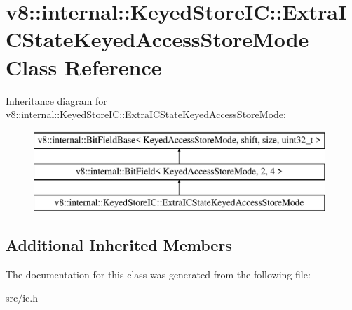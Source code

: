 \hypertarget{classv8_1_1internal_1_1_keyed_store_i_c_1_1_extra_i_c_state_keyed_access_store_mode}{}\section{v8\+:\+:internal\+:\+:Keyed\+Store\+I\+C\+:\+:Extra\+I\+C\+State\+Keyed\+Access\+Store\+Mode Class Reference}
\label{classv8_1_1internal_1_1_keyed_store_i_c_1_1_extra_i_c_state_keyed_access_store_mode}
Inheritance diagram for v8\+:\+:internal\+:\+:Keyed\+Store\+I\+C\+:\+:Extra\+I\+C\+State\+Keyed\+Access\+Store\+Mode\+:\begin{figure}[H]
\begin{center}
\leavevmode
\includegraphics[height=3.000000cm]{classv8_1_1internal_1_1_keyed_store_i_c_1_1_extra_i_c_state_keyed_access_store_mode}
\end{center}
\end{figure}
\subsection*{Additional Inherited Members}


The documentation for this class was generated from the following file\+:\begin{DoxyCompactItemize}
\item 
src/ic.\+h\end{DoxyCompactItemize}
